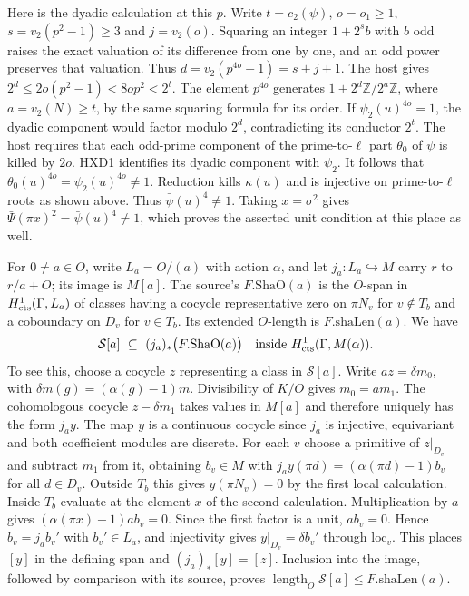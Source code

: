 Here is the dyadic calculation at this $p$. Write $t=c_2(\psi)$,
$o=o_1\ge1$, $s=v_2(p^2-1)\ge3$ and $j=v_2(o)$.
Squaring an integer $1+2^s b$ with $b$ odd raises the exact valuation
of its difference from one by one, and an odd power preserves that
valuation. Thus $d=v_2(p^{4o}-1)=s+j+1$. The host gives
$2^d\le 2o(p^2-1)<8op^2<2^t$.
The element $p^{4o}$ generates $1+2^d\mathbb Z/2^a\mathbb Z$,
where $a=v_2(N)\ge t$, by the same squaring formula for its order.
If $\psi_2(u)^{4o}=1$, the dyadic component would factor modulo
$2^d$, contradicting its conductor $2^t$. The host requires that each
odd-prime component of the prime-to-$\ell$ part $\theta_0$ of $\psi$
is killed by $2o$. HXD1 identifies its dyadic component with $\psi_2$.
It follows that $\theta_0(u)^{4o}=\psi_2(u)^{4o}\ne1$.
Reduction kills $\kappa(u)$ and is injective on prime-to-$\ell$ roots
as shown above. Thus $\bar\psi(u)^4\ne1$. Taking $x=\sigma^2$ gives
$\bar\Psi(\pi x)^2=\bar\psi(u)^4\ne1$, which proves the asserted unit
condition at this place as well.

For $0\ne a\in O$, write $L_a=O/(a)$ with action $\alpha$, and let
$j_a:L_a\hookrightarrow M$ carry $r$ to $r/a+O$; its image is $M[a]$.
The source's $F.\mathrm{ShaO}(a)$ is the $O$-span in
$H^1_{\rm cts}(\Gamma,L_a)$ of classes having a cocycle representative
zero on $\pi N_v$ for $v\notin T_b$ and a coboundary on $D_v$ for
$v\in T_b$. Its extended $O$-length is $F.\mathrm{shaLen}(a)$.
We have
\[
    \mathcal S[a]\ \subseteq\ (j_a)_*\big(F.\mathrm{ShaO}(a)\big)
    \quad\text{inside }H^1_{\rm cts}(\Gamma,M(\alpha)).
\]
To see this, choose a cocycle $z$ representing a class in $\mathcal S[a]$.
Write $az=\delta m_0$, with $\delta m(g)=(\alpha(g)-1)m$.
Divisibility of $K/O$ gives $m_0=am_1$. The cohomologous cocycle
$z-\delta m_1$ takes values in $M[a]$ and therefore uniquely has the
form $j_a y$. The map $y$ is a continuous cocycle since $j_a$ is
injective, equivariant and both coefficient modules are discrete.
For each $v$ choose a primitive of $z|_{D_v}$ and subtract $m_1$ from
it, obtaining $b_v\in M$ with
$j_a y(\pi d)=(\alpha(\pi d)-1)b_v$ for all $d\in D_v$.
Outside $T_b$ this gives $y(\pi N_v)=0$ by the first local calculation.
Inside $T_b$ evaluate at the element $x$ of the second calculation.
Multiplication by $a$ gives $(\alpha(\pi x)-1)ab_v=0$.
Since the first factor is a unit, $ab_v=0$. Hence $b_v=j_a b_v'$
with $b_v'\in L_a$, and injectivity gives $y|_{D_v}=\delta b_v'$
through $\mathrm{loc}_v$. This places $[y]$ in the defining span and
$(j_a)_*[y]=[z]$. Inclusion into the image, followed by comparison
with its source, proves
$\operatorname{length}_O\mathcal S[a]\le F.\mathrm{shaLen}(a)$.

